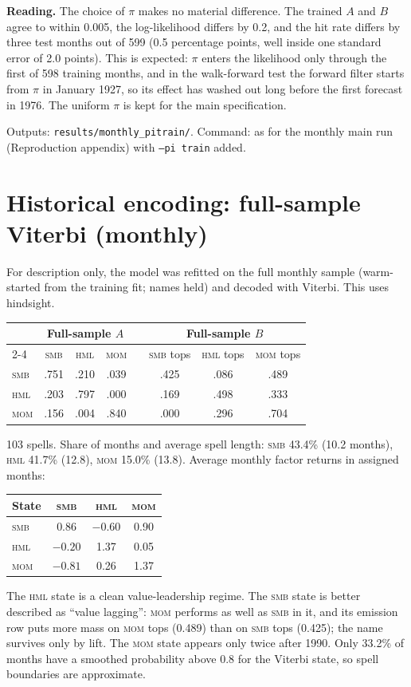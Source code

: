 \documentclass[11pt]{article}
\newcommand{\SMB}{\textsc{smb}}
\newcommand{\HML}{\textsc{hml}}
\newcommand{\MOM}{\textsc{mom}}
\begin{document}
\textbf{Reading.} The choice of $\pi$ makes no material difference. The trained $A$ and $B$ agree to within 0.005, the log-likelihood differs by 0.2, and the hit rate differs by three test months out of 599 (0.5 percentage points, well inside one standard error of 2.0 points). This is expected: $\pi$ enters the likelihood only through the first of 598 training months, and in the walk-forward test the forward filter starts from $\pi$ in January 1927, so its effect has washed out long before the first forecast in 1976. The uniform $\pi$ is kept for the main specification.

Outputs: \texttt{results/monthly\_pitrain/}. Command: as for the monthly main run (Reproduction appendix) with \texttt{--pi train} added.

\section{Historical encoding: full-sample Viterbi (monthly)}\label{sec:viterbi}

For description only, the model was refitted on the full monthly sample (warm-started from the training fit; names held) and decoded with Viterbi. This uses hindsight.

\begin{center}
\begin{tabular}{l ccc c ccc}
\toprule
 & \multicolumn{3}{c}{Full-sample $A$} && \multicolumn{3}{c}{Full-sample $B$} \\
\cmidrule{2-4}\cmidrule{6-8}
 & \SMB & \HML & \MOM && \SMB{} tops & \HML{} tops & \MOM{} tops \\
\midrule
\SMB & .751 & .210 & .039 && .425 & .086 & .489 \\
\HML & .203 & .797 & .000 && .169 & .498 & .333 \\
\MOM & .156 & .004 & .840 && .000 & .296 & .704 \\
\bottomrule
\end{tabular}
\end{center}

103 spells. Share of months and average spell length: \SMB{} 43.4\% (10.2 months), \HML{} 41.7\% (12.8), \MOM{} 15.0\% (13.8). Average monthly factor returns in assigned months:
\begin{center}
\begin{tabular}{lccc}
\toprule
State & \SMB & \HML & \MOM \\
\midrule
\SMB & 0.86 & $-0.60$ & 0.90 \\
\HML & $-0.20$ & 1.37 & 0.05 \\
\MOM & $-0.81$ & 0.26 & 1.37 \\
\bottomrule
\end{tabular}
\end{center}
The \HML{} state is a clean value-leadership regime. The \SMB{} state is better described as ``value lagging'': \MOM{} performs as well as \SMB{} in it, and its emission row puts more mass on \MOM{} tops (0.489) than on \SMB{} tops (0.425); the name survives only by lift. The \MOM{} state appears only twice after 1990. Only 33.2\% of months have a smoothed probability above 0.8 for the Viterbi state, so spell boundaries are approximate.
\end{document}
